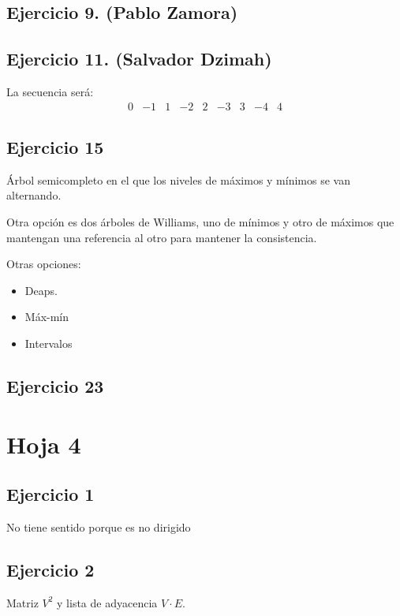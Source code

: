 \documentclass[10pt,a4paper,openright]{book}
\theoremstyle{break}
\begin{document}
\section{Ejercicio 9. (Pablo Zamora)}%
\label{sec:ejercicio_9_pablo_zamora_}

\section{Ejercicio 11. (Salvador Dzimah)}%
\label{sec:ejercicio_11_salvador_dzimah_}
La secuencia será:
\[
    \begin{matrix} 0 & -1 & 1 & -2 & 2 & -3 & 3 & -4 & 4 \end{matrix} 
\]

\section{Ejercicio 15}%
\label{sec:ejercicio_15}
Árbol semicompleto en el que los niveles de máximos y mínimos se van alternando.

Otra opción es dos árboles de Williams, uno de mínimos y otro de máximos que mantengan una referencia al otro para mantener la consistencia.

Otras opciones:
\begin{itemize}
    \item Deaps.
    \item Máx-mín
    \item Intervalos
\end{itemize}

\section{Ejercicio 23}%
\label{sec:ejercicio_23}

\chapter{Hoja 4}%
\label{cha:hoja_4}
\section{Ejercicio 1}%
\label{sec:ejercicio_1_4}
No tiene sentido porque es no dirigido

\section{Ejercicio 2}%
\label{sec:ejercicio_2_4}
Matriz $V^2$ y lista de adyacencia $V\cdot E$.
\end{document}
